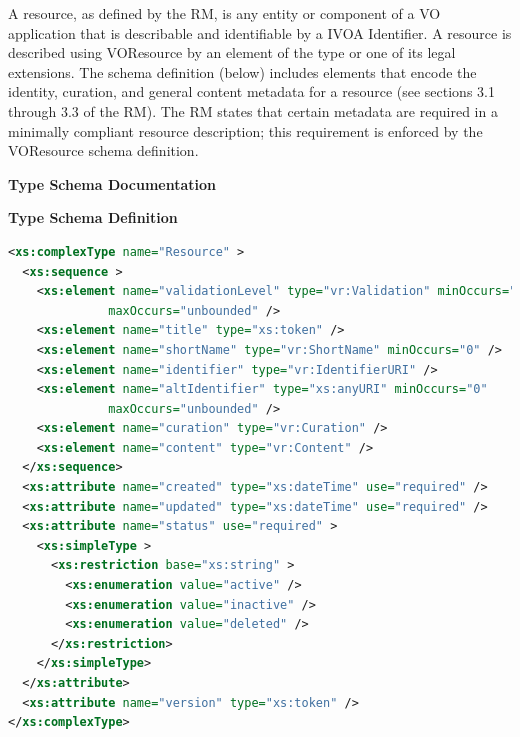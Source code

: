 \documentclass[11pt,a4paper]{ivoa}
\begin{document}
\label{sect:restype}

A resource, as defined by the RM, is any entity or component of a VO
application that is describable and identifiable by a IVOA Identifier.
A resource is described using VOResource by an element of the type
 or one of its legal extensions.  The schema
definition (below) includes elements that encode the identity, curation,
and general content metadata for a resource (see sections 3.1 through
3.3 of the RM).  The RM states that certain metadata are required in a
minimally compliant resource description; this requirement is enforced
by the VOResource schema definition.  

\begin{generated}
\begingroup
      	\renewcommand*\descriptionlabel[1]{%
      	\hbox to 5.5em{\emph{#1}\hfil}}\vspace{2ex}\noindent\textbf{ Type Schema Documentation}


\vspace{1ex}\noindent\textbf{ Type Schema Definition}

\begin{lstlisting}[language=XML,basicstyle=\footnotesize]
<xs:complexType name="Resource" >
  <xs:sequence >
    <xs:element name="validationLevel" type="vr:Validation" minOccurs="0"
              maxOccurs="unbounded" />
    <xs:element name="title" type="xs:token" />
    <xs:element name="shortName" type="vr:ShortName" minOccurs="0" />
    <xs:element name="identifier" type="vr:IdentifierURI" />
    <xs:element name="altIdentifier" type="xs:anyURI" minOccurs="0"
              maxOccurs="unbounded" />
    <xs:element name="curation" type="vr:Curation" />
    <xs:element name="content" type="vr:Content" />
  </xs:sequence>
  <xs:attribute name="created" type="xs:dateTime" use="required" />
  <xs:attribute name="updated" type="xs:dateTime" use="required" />
  <xs:attribute name="status" use="required" >
    <xs:simpleType >
      <xs:restriction base="xs:string" >
        <xs:enumeration value="active" />
        <xs:enumeration value="inactive" />
        <xs:enumeration value="deleted" />
      </xs:restriction>
    </xs:simpleType>
  </xs:attribute>
  <xs:attribute name="version" type="xs:token" />
</xs:complexType>
\end{lstlisting}


\end{generated}
\end{document}

